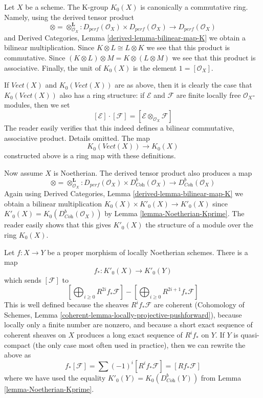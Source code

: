 \begin{remark}
\label{remark-K-ring}
Let $X$ be a scheme. The K-group $K_0(X)$ is canonically a commutative ring.
Namely, using the derived tensor product
$$
\otimes = \otimes^\mathbf{L}_{\mathcal{O}_X} :
D_{perf}(\mathcal{O}_X) \times D_{perf}(\mathcal{O}_X)
\longrightarrow
D_{perf}(\mathcal{O}_X)
$$
and Derived Categories, Lemma \ref{derived-lemma-bilinear-map-K}
we obtain a bilinear multiplication. Since $K \otimes L \cong L \otimes K$
we see that this product is commutative. Since
$(K \otimes L) \otimes M = K \otimes (L \otimes M)$
we see that this product is associative.
Finally, the unit of $K_0(X)$ is the element $1 = [\mathcal{O}_X]$.

\medskip\noindent
If $\textit{Vect}(X)$ and $K_0(\textit{Vect}(X))$ are as above, then
it is clearly the case that $K_0(\textit{Vect}(X))$ also has a
ring structure: if $\mathcal{E}$ and $\mathcal{F}$ are finite locally free
$\mathcal{O}_X$-modules, then we set
$$
[\mathcal{E}] \cdot [\mathcal{F}] =
[\mathcal{E} \otimes_{\mathcal{O}_X} \mathcal{F}]
$$
The reader easily verifies that this indeed defines a bilinear
commutative, associative product. Details omitted. The map
$$
K_0(\textit{Vect}(X)) \longrightarrow K_0(X)
$$
constructed above is a ring map with these definitions.

\medskip\noindent
Now assume $X$ is Noetherian. The derived tensor product also produces
a map
$$
\otimes = \otimes^\mathbf{L}_{\mathcal{O}_X} :
D_{perf}(\mathcal{O}_X) \times D^b_{\textit{Coh}}(\mathcal{O}_X)
\longrightarrow
D^b_{\textit{Coh}}(\mathcal{O}_X)
$$
Again using Derived Categories, Lemma \ref{derived-lemma-bilinear-map-K}
we obtain a bilinear multiplication $K_0(X) \times K'_0(X) \to K'_0(X)$
since $K'_0(X) = K_0(D^b_{\textit{Coh}}(\mathcal{O}_X))$ by
Lemma \ref{lemma-Noetherian-Kprime}.
The reader easily shows that this gives $K'_0(X)$ the structure
of a module over the ring $K_0(X)$.
\end{remark}

\begin{remark}
\label{remark-pushforward-K}
Let $f : X \to Y$ be a proper morphism of locally Noetherian schemes.
There is a map
$$
f_* : K'_0(X) \longrightarrow K'_0(Y)
$$
which sends $[\mathcal{F}]$ to
$$
[\bigoplus\nolimits_{i \geq 0} R^{2i}f_*\mathcal{F}] -
[\bigoplus\nolimits_{i \geq 0} R^{2i + 1}f_*\mathcal{F}]
$$
This is well defined because the sheaves $R^if_*\mathcal{F}$
are coherent (Cohomology of Schemes, Lemma
\ref{coherent-lemma-locally-projective-pushforward}), because locally
only a finite number are nonzero, and because
a short exact sequence of coherent sheaves on $X$ produces a long
exact sequence of $R^if_*$ on $Y$. If $Y$ is quasi-compact (the only
case most often used in practice), then we can rewrite the above as
$$
f_*[\mathcal{F}] = \sum (-1)^i[R^if_*\mathcal{F}] = [Rf_*\mathcal{F}]
$$
where we have used the equality $K'_0(Y) = K_0(D^b_{\textit{Coh}}(Y))$ from
Lemma \ref{lemma-Noetherian-Kprime}.
\end{remark}

